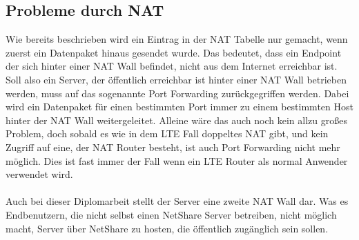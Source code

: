 \subsection{Probleme durch NAT}
Wie bereits beschrieben wird ein Eintrag in der NAT Tabelle nur gemacht, wenn zuerst ein Datenpaket hinaus gesendet wurde. Das bedeutet, dass ein Endpoint der sich hinter einer NAT Wall befindet, nicht aus dem Internet erreichbar ist. Soll also ein Server, der öffentlich erreichbar ist hinter einer NAT Wall betrieben werden, muss auf das sogenannte Port Forwarding zurückgegriffen werden. Dabei wird ein Datenpaket für einen bestimmten Port immer zu einem bestimmten Host hinter der NAT Wall weitergeleitet. Alleine wäre das auch noch kein allzu großes Problem, doch sobald es wie in dem LTE Fall doppeltes NAT gibt, und kein Zugriff auf eine, der NAT Router besteht, ist auch Port Forwarding nicht mehr möglich. Dies ist fast immer der Fall wenn ein LTE Router als normal Anwender verwendet wird.
\\\\
Auch bei dieser Diplomarbeit stellt der Server eine zweite NAT Wall dar. Was es Endbenutzern, die nicht selbst einen NetShare Server betreiben, nicht möglich macht, Server über NetShare zu hosten, die öffentlich zugänglich sein sollen.